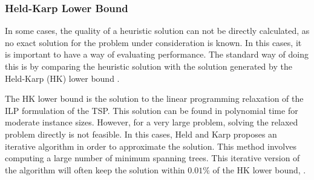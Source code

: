 \subsubsection{Held-Karp Lower Bound}

In some cases, the quality of a heuristic solution can not be directly calculated, as no exact solution for the problem under consideration is known. In this cases, it is important to have a way of evaluating performance. The standard way of doing this is by comparing the heuristic solution with the solution generated by the Held-Karp (HK) lower bound \cite{held_karp_lb}.

The HK lower bound is the solution to the linear programming relaxation of the ILP formulation of the TSP. This solution can be found in polynomial time for moderate instance sizes. However, for a very large problem, solving the relaxed problem directly is not feasible. In this cases, Held and Karp proposes an iterative algorithm in order to approximate the solution. This method involves computing a large number of minimum spanning trees. This iterative version of the algorithm will often keep the solution
within $0.01\%$ of the HK lower bound, \cite{heuristics_tsp}.
